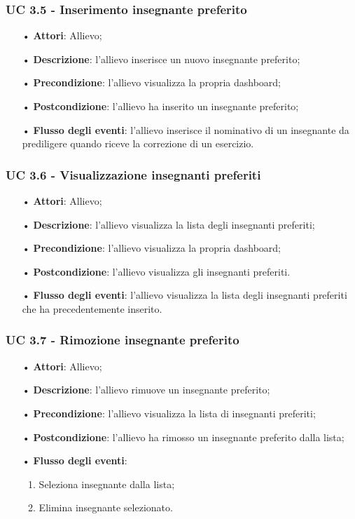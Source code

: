 \subsubsection{UC 3.5 - Inserimento insegnante preferito}
\begin{itemize}
\item[•]\textbf{Attori}: Allievo;
\item[•]\textbf{Descrizione}: l'allievo inserisce un nuovo insegnante preferito;
\item[•]\textbf{Precondizione}: l'allievo visualizza la propria dashboard;
\item[•]\textbf{Postcondizione}: l'allievo ha inserito un insegnante preferito;
\item[•]\textbf{Flusso degli eventi}: l'allievo inserisce il nominativo di un insegnante da prediligere quando riceve la correzione di un esercizio.
\end{itemize}

\subsubsection{UC 3.6 - Visualizzazione insegnanti preferiti}
\begin{itemize}
	\item[•]\textbf{Attori}: Allievo;
	\item[•]\textbf{Descrizione}: l'allievo visualizza la lista degli insegnanti preferiti;
	\item[•]\textbf{Precondizione}: l'allievo visualizza la propria dashboard;
	\item[•]\textbf{Postcondizione}: l'allievo visualizza gli insegnanti preferiti.
	\item[•]\textbf{Flusso degli eventi}: l'allievo visualizza la lista degli insegnanti preferiti che ha precedentemente inserito.
\end{itemize}

\subsubsection{UC 3.7 - Rimozione insegnante preferito}
\begin{itemize}
	\item[•]\textbf{Attori}: Allievo;
	\item[•]\textbf{Descrizione}: l'allievo rimuove un insegnante preferito;
	\item[•]\textbf{Precondizione}: l'allievo visualizza la lista di insegnanti preferiti;
	\item[•]\textbf{Postcondizione}: l'allievo ha rimosso un insegnante preferito dalla lista;
	\item[•]\textbf{Flusso degli eventi}: 
	\begin{enumerate}
	 \item Seleziona insegnante dalla lista;
	 \item Elimina insegnante selezionato.
	\end{enumerate}
\end{itemize}

